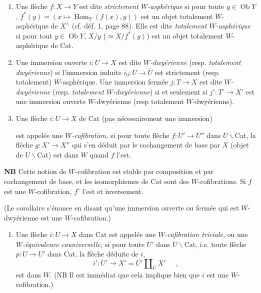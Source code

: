 \begin{enumerate}[label=\alph*)]
\item Une flèche $f:X\longrightarrow Y$ est dite \textit{strictement $W$-asphérique} si pour toute $y\in\operatorname{Ob}Y$, $f^*(y)=(x\longmapsto\operatorname{Hom}_Y(f(x),y))$ est un objet totalement $W$-asphérique de $X^\wedge$ (cf. déf. 1, page 88). Elle est dite \textit{totalement $W$-asphérique} si pour tout $y\in\operatorname{Ob}Y$, $X/y$ ($\simeq X/f^*(y)$) est un objet totalement $W$-asphérique de Cat.

\item {}
Une immersion ouverte $i:U\longrightarrow X$ est dite \textit{$W$-dwyérienne} (resp. \textit{totalement} \textit{dwyérienne}) si l'immersion induite $i_0:U\longrightarrow\bar{U}$ est strictement (resp. totalement) $W$-asphérique. Une immersion fermée $j:T\longrightarrow X$ est dite \textit{$W$-dwyérienne} (resp. \textit{totalement $W$-dwyérienne}) si et seulement si $j^\circ:T^\circ\longrightarrow X^\circ$ est une immersion ouverte $W$-dwyérienne (resp totalement $W$-dwyérienne).

\item Une flèche $i:U\longrightarrow X$ de Cat (pas nécessairement une immersion)


est appelée une \textit{$W$-cofibration,} si pour toute flèche $f:U'\longrightarrow U''$ dans $U\backslash$Cat, la flèche $g:X'\longrightarrow X''$ qui s'en déduit par le cochangement de base par $X$ (objet de $U\backslash$Cat) est dans $W$ quand $f$ l'est.
\end{enumerate}

\textbf{NB} Cette notion de $W$-cofibration est stable par composition et par cochangement de base, et les isomorphismes de Cat sont des $W$-cofibrations. Si $f$ est une $W$-cofibration, $f^\circ$ l'est et inversement.

(Le corollaire s'énonce en disant qu'une immersion ouverte ou fermée qui est $W$-dwyérienne est une $W$-cofibration.)

\begin{enumerate}[label=\alph*), start=4]
\item Une flèche $i:U\longrightarrow X$ dans Cat est appelée une \textit{$W$-cofibration triviale}, ou une \textit{$W$-équivalence couniverselle,} si pour toute $U'$ dans $U\backslash$Cat, i.e. toute flèche $p:U\longrightarrow U'$ dans Cat, la flèche déduite de $i$,
\[ i':U'\longrightarrow X'=U'\amalg_U X'\quad\ \ , \]
est dans $W$. (NB Il est immédiat que cela implique bien que $i$ est une $W$-cofibration.)
\end{enumerate}

